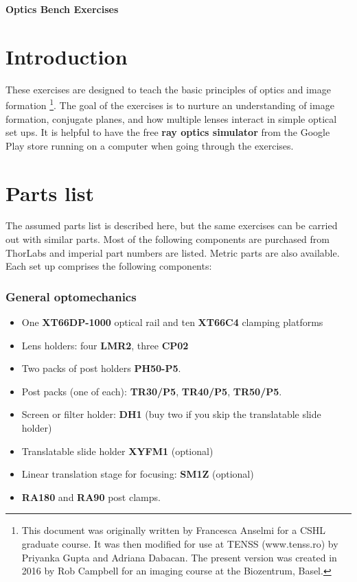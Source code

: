 \documentclass[a4paper]{report}
\begin{document}
\setcounter{secnumdepth}{2}

\begin{center}
\textbf{\Large{Optics Bench Exercises}}
\end{center}

\section{Introduction}
These exercises are designed to teach the basic principles of optics and image formation
\footnote{This document was originally written by Francesca Anselmi for a CSHL graduate course.
It was then modified for use at TENSS (www.tenss.ro) by Priyanka Gupta and Adriana Dabacan. 
The present version was created in 2016 by Rob Campbell for an imaging course at the Biozentrum, Basel.}.
The goal of the exercises is to nurture an understanding of image formation, conjugate planes, and how multiple lenses interact in simple optical set ups. 
It is helpful to have the free \textbf{ray optics simulator} from the Google Play store running on a computer when going through the exercises. 

\section{Parts list}
The assumed parts list is described here, but the same exercises can be carried out with similar parts. 
Most of the following components are purchased from ThorLabs and imperial part numbers are listed.
Metric parts are also available. 
Each set up comprises the following components:


\subsubsection{General optomechanics}
\begin{itemize}
\setlength\itemsep{0.1em}
\item One \textbf{XT66DP-1000} optical rail and ten \textbf{XT66C4} clamping platforms
\item Lens holders: four \textbf{LMR2}, three \textbf{CP02}
\item Two packs of post holders \textbf{PH50-P5}.
\item Post packs (one of each): \textbf{TR30/P5}, \textbf{TR40/P5}, \textbf{TR50/P5}.
\item Screen or filter holder: \textbf{DH1} (buy two if you skip the translatable slide holder)
\item Translatable slide holder \textbf{XYFM1} (optional)
\item Linear translation stage for focusing: \textbf{SM1Z} (optional)
\item \textbf{RA180} and \textbf{RA90} post clamps.
\end{itemize}
\end{document}
